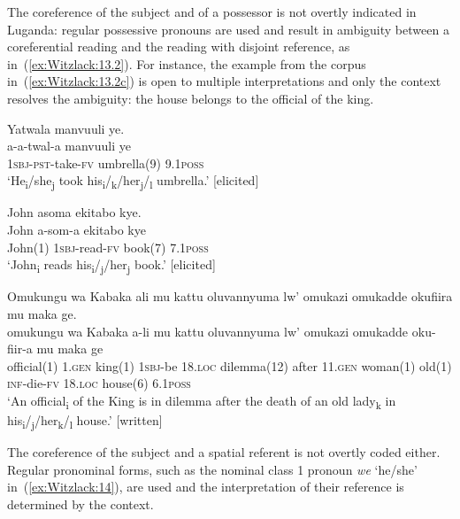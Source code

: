 \documentclass[output=paper,colorlinks,citecolor=brown,
]{langscibook}
\begin{document}
The coreference of the subject and of a possessor is not overtly indicated in Luganda: regular possessive pronouns are used and result in ambiguity between a coreferential reading and the reading with disjoint reference, as in~(\ref{ex:Witzlack:13.2}). 
For instance, the example from the corpus in~(\ref{ex:Witzlack:13.2c}) is open to multiple interpretations and only the context resolves the ambiguity: the house belongs to the official of the king.


\ea\label{ex:Witzlack:13.2}
\ea \label{ex:Witzlack:13.2a}
    \glll Yatwala manvuuli ye.\\
    a-a-twal-a 	manvuuli ye\\
    \textsc{1sbj}-\textsc{pst}-take-\textsc{fv}	umbrella(9) 	\textsc{9.1poss}\\
    \glt ‘He\textsubscript{i}/she\textsubscript{j} took his\textsubscript{i}/\textsubscript{k}/her\textsubscript{j}/\textsubscript{l} umbrella.’ [elicited]

\ex \label{ex:Witzlack:13.2b}
    \glll John asoma ekitabo kye.\\
   John	a-som-a ekitabo kye\\
    John(1)	\textsc{1sbj}-read-\textsc{fv}	book(7) \textsc{7.1poss}\\
    \glt ‘John\textsubscript{i} reads his\textsubscript{i}/\textsubscript{j}/her\textsubscript{j} book.’ [elicited]

\ex \label{ex:Witzlack:13.2c}
    \glll Omukungu wa Kabaka ali mu kattu oluvannyuma lw’ omukazi omukadde okufiira mu maka ge.\\
    omukungu wa	Kabaka	a-li mu	kattu oluvannyuma lw’ omukazi		omukadde	oku-fiir-a		mu		maka	ge\\
    official(1)	\textsc{1.gen}	king(1)	\textsc{1sbj}-be	\textsc{18.loc}	dilemma(12)	after \textsc{11.gen}	woman(1)	old(1)		\textsc{inf}-die-\textsc{fv}	\textsc{18.loc}	house(6)	\textsc{6.1poss}\\
    \glt ‘An official\textsubscript{i} of the King is in dilemma after the death of an old lady\textsubscript{k} in his\textsubscript{i}/\textsubscript{j}/her\textsubscript{k}/\textsubscript{l} house.’ [written]%

\z 
\z

The coreference of the subject and a spatial referent is not overtly coded either. 
Regular pronominal forms, such as the nominal class 1 pronoun \emph{we} ‘he/she’ in~(\ref{ex:Witzlack:14}), are used and the interpretation of their reference is determined by the context.
\end{document}
